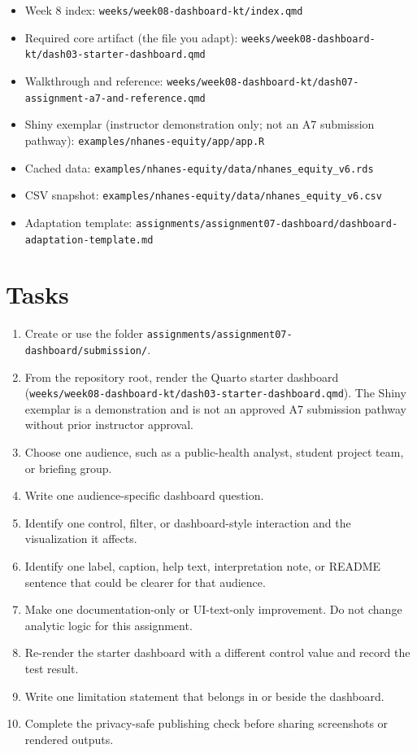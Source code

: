 \documentclass[
  letterpaper,
  DIV=11,
  numbers=noendperiod,
  oneside]{scrreprt}
\providecommand{\tightlist}{%
  \setlength{\itemsep}{0pt}\setlength{\parskip}{0pt}}
\begin{document}
\begin{itemize}
\tightlist
\item
  Week 8 index: \texttt{weeks/week08-dashboard-kt/index.qmd}
\item
  Required core artifact (the file you adapt):
  \texttt{weeks/week08-dashboard-kt/dash03-starter-dashboard.qmd}
\item
  Walkthrough and reference:
  \texttt{weeks/week08-dashboard-kt/dash07-assignment-a7-and-reference.qmd}
\item
  Shiny exemplar (instructor demonstration only; not an A7 submission
  pathway): \texttt{examples/nhanes-equity/app/app.R}
\item
  Cached data:
  \texttt{examples/nhanes-equity/data/nhanes\_equity\_v6.rds}
\item
  CSV snapshot:
  \texttt{examples/nhanes-equity/data/nhanes\_equity\_v6.csv}
\item
  Adaptation template:
  \texttt{assignments/assignment07-dashboard/dashboard-adaptation-template.md}
\end{itemize}

\section{Tasks}\label{tasks-6}

\begin{enumerate}
\def\labelenumi{\arabic{enumi}.}
\tightlist
\item
  Create or use the folder
  \texttt{assignments/assignment07-dashboard/submission/}.
\item
  From the repository root, render the Quarto starter dashboard
  (\texttt{weeks/week08-dashboard-kt/dash03-starter-dashboard.qmd}). The
  Shiny exemplar is a demonstration and is not an approved A7 submission
  pathway without prior instructor approval.
\item
  Choose one audience, such as a public-health analyst, student project
  team, or briefing group.
\item
  Write one audience-specific dashboard question.
\item
  Identify one control, filter, or dashboard-style interaction and the
  visualization it affects.
\item
  Identify one label, caption, help text, interpretation note, or README
  sentence that could be clearer for that audience.
\item
  Make one documentation-only or UI-text-only improvement. Do not change
  analytic logic for this assignment.
\item
  Re-render the starter dashboard with a different control value and
  record the test result.
\item
  Write one limitation statement that belongs in or beside the
  dashboard.
\item
  Complete the privacy-safe publishing check before sharing screenshots
  or rendered outputs.
\end{enumerate}
\end{document}
